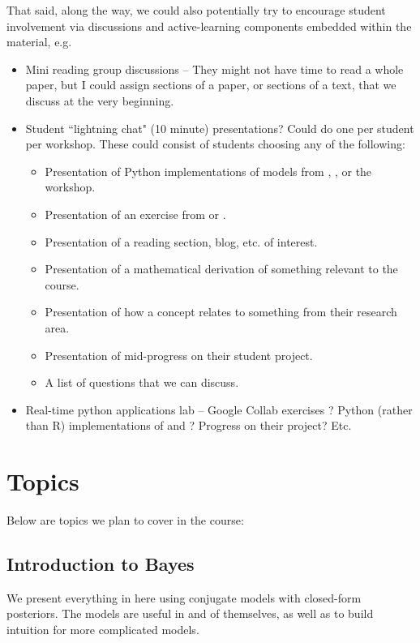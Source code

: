 \documentclass{article} %
\begin{document}
That said,  along the way,  we could also potentially try to encourage student involvement via discussions and active-learning components embedded within the material,  e.g.

\begin{itemize}
\item Mini reading group discussions  -- They might not have time to read a whole paper,  but I could assign sections of a paper,  or sections of a text, that we discuss at the very beginning.
\item Student ``lightning chat" (10 minute) presentations?  Could do one per student per workshop.  These could consist of students choosing any of the following:
	\begin{itemize}
	\item Presentation of Python implementations of models from \cite{hoff2009first} ,  \cite{ gelman2013bayesian},  or the workshop.
	\item Presentation of an exercise from \cite{gelman2013bayesian} or \cite{hoff2009first}.
	\item Presentation of a reading section,  blog,  etc.  of interest.
	\item Presentation of a mathematical derivation of something relevant to the course.
	\item Presentation of how a concept relates to something from their research area.
	\item Presentation of mid-progress on their student project.
	\item A list of questions that we can discuss.
	\end{itemize}
\item Real-time python applications lab -- Google Collab exercises ?  Python (rather than R) implementations of \cite{hoff2009first} and \cite{gelman2013bayesian} ?  Progress on their project?  Etc.
\end{itemize}


\section{Topics}

Below are topics we plan to cover in the course:

\subsection{Introduction to Bayes}

We present everything in here using conjugate models with closed-form posteriors.  The models are useful in and of themselves,  as well as to build intuition for more complicated models.   
\end{document}
